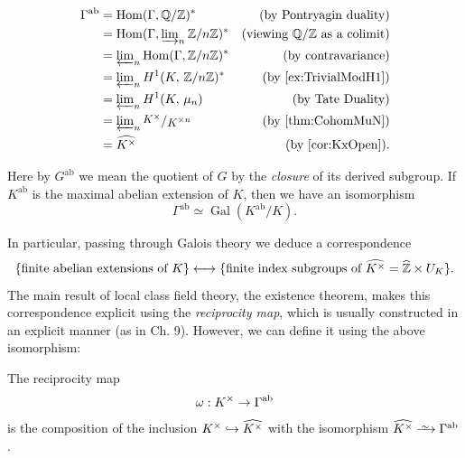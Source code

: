 \documentclass[a4paper, oneside]{memoir}
\begin{document}
\begin{align*}
	\Gamma^{\text{ab}} & = \Hom(\Gamma, \Q/\Z)^*                                    & \text{(by Pontryagin duality)}        \\
	                   & = \Hom(\Gamma, \varinjlim_n\nolimits \Zn)^*                & \text{(viewing $\Q/\Z$ as a colimit)} \\
	                   & = \varprojlim_n\nolimits \Hom(\Gamma, \Zn)^*               & \text{(by contravariance)}            \\
	                   & = \varprojlim_n\nolimits \H{1}{K}{\Zn}^*                   & \text{(by \ref{ex:TrivialModH1})}     \\
	                   & = \varprojlim_n\nolimits \H{1}{K}{\mu_n}                   & \text{(by Tate Duality)}              \\
	                   & = \varprojlim_n\nolimits \sfrac{K^{\times}}{\K^{\times n}} & \text{(by \ref{thm:CohomMuN})}        \\
	                   & = \widehat{\K^\times}                                      & \text{(by \ref{cor:KxOpen})}.
\end{align*}

\begin{remark}
	Here by $G^{\text{ab}}$ we mean the quotient of $G$ by the \textit{closure} of its derived subgroup. If $K^{\text{ab}}$ is the maximal abelian extension of $K$, then we have an isomorphism
	\[
		\Gamma^{\text{ab}} \simeq \operatorname{Gal}(K^{\text{ab}}/K).
	\]
\end{remark}
\noindent In particular, passing through Galois theory we deduce a correspondence
\begin{equation}\label{eq:ClassField}
	\{\text{finite abelian extensions of }K\} \longleftrightarrow \{\text{finite index subgroups of }\widehat{K^\times} = \widehat{\mathbb{Z}} \times U_K\}
	.\end{equation}
The main result of local class field theory, the existence theorem, makes this correspondence explicit using the \textit{reciprocity map}, which is usually constructed in an explicit manner (as in \cite{Harari} Ch. 9). However, we can define it using the above isomorphism:

\begin{definition}
	The reciprocity map
	\[
		\omega:K^\times \to \Gamma^{\text{ab}}
	\]
	is the composition of the inclusion $K^\times \hookrightarrow \widehat{K^\times}$ with the isomorphism $\widehat{\K^\times} \Iso \Gamma^{\text{ab}}$.
\end{definition}
\end{document}
